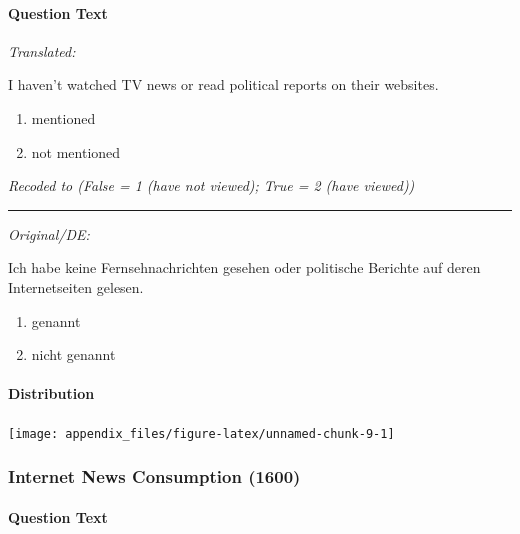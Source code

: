\documentclass[
]{article}
\providecommand{\tightlist}{%
  \setlength{\itemsep}{0pt}\setlength{\parskip}{0pt}}
\begin{document}
\hypertarget{question-text-6}{%
\paragraph{Question Text}\label{question-text-6}}

\emph{Translated:}

I haven't watched TV news or read political reports on their websites.

\begin{enumerate}
\def\labelenumi{(\arabic{enumi})}
\tightlist
\item
  mentioned
\item
  not mentioned
\end{enumerate}

\emph{Recoded to (False = 1 (have not viewed); True = 2 (have viewed))}

\begin{center}\rule{0.5\linewidth}{0.5pt}\end{center}

\emph{Original/DE:}

Ich habe keine Fernsehnachrichten gesehen oder politische Berichte auf deren Internetseiten gelesen.

\begin{enumerate}
\def\labelenumi{(\arabic{enumi})}
\tightlist
\item
  genannt
\item
  nicht genannt
\end{enumerate}

\hypertarget{distribution-6}{%
\paragraph{Distribution}\label{distribution-6}}

\begin{center}\texttt{[image: appendix\_files/figure-latex/unnamed-chunk-9-1]} \end{center}

\hypertarget{internet-news-consumption-1600}{%
\subsubsection{Internet News Consumption (1600)}\label{internet-news-consumption-1600}}

\hypertarget{question-text-7}{%
\paragraph{Question Text}\label{question-text-7}}
\end{document}
